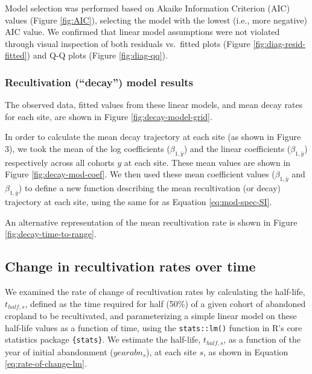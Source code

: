 \documentclass[9pt,twocolumn,twoside,lineno]{pnas-new}
\begin{document}
Model selection was performed based on Akaike Information Criterion (AIC) values (Figure \ref{fig:AIC}), selecting the model with the lowest (i.e., more negative) AIC value.
We confirmed that linear model assumptions were not violated through visual inspection of both residuals vs.~fitted plots (Figure \ref{fig:diag-resid-fitted}) and Q-Q plots (Figure \ref{fig:diag-qq}).

\hypertarget{recultivation-decay-model-results}{%
\subsubsection{Recultivation (``decay'') model results}\label{recultivation-decay-model-results}}

The observed data, fitted values from these linear models, and mean decay rates for each site, are shown in Figure \ref{fig:decay-model-grid}.

In order to calculate the mean decay trajectory at each site (as shown in Figure 3), we took the mean of the log coefficients (\(\beta_{1, \bar{y}}\)) and the linear coefficients (\(\beta_{1, \bar{y}}\)) respectively across all cohorts \(y\) at each site.
These mean values are shown in Figure \ref{fig:decay-mod-coef}.
We then used these mean coefficient values (\(\beta_{1, \bar{y}}\) and \(\beta_{1, \bar{y}}\)) to define a new function describing the mean recultivation (or decay) trajectory at each site, using the same for as Equation \eqref{eq:mod-spec-SI}.

An alternative representation of the mean recultivation rate is shown in Figure \ref{fig:decay-time-to-range}.

\hypertarget{section-methods-rate-of-change}{%
\subsection{Change in recultivation rates over time}\label{section-methods-rate-of-change}}

We examined the rate of change of recultivation rates by calculating the half-life, \(t_{half,s}\), defined as the time required for half (50\%) of a given cohort of abandoned cropland to be recultivated, and parameterizing a simple linear model on these half-life values as a function of time, using the \texttt{stats::lm()} function in R's core statistics package \texttt{\{stats\}}.
We estimate the half-life, \(t_{half,s}\), as a function of the year of initial abandonment (\(yearabn_{s}\)), at each site \(s\), as shown in Equation \eqref{eq:rate-of-change-lm}.
\end{document}
